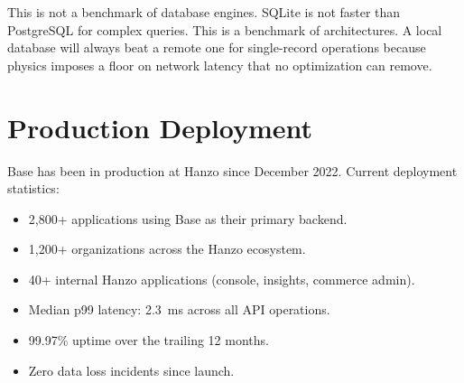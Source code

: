 \documentclass[11pt]{article}
\begin{document}
\begin{center}
\end{center}

This is not a benchmark of database engines. SQLite is not faster than
PostgreSQL for complex queries. This is a benchmark of architectures. A local
database will always beat a remote one for single-record operations because
physics imposes a floor on network latency that no optimization can remove.

\section{Production Deployment}
\label{sec:production}

Base has been in production at Hanzo since December 2022. Current deployment
statistics:

\begin{itemize}[leftmargin=1.1em]
    \item 2,800+ applications using Base as their primary backend.
    \item 1,200+ organizations across the Hanzo ecosystem.
    \item 40+ internal Hanzo applications (console, insights, commerce admin).
    \item Median p99 latency: 2.3~ms across all API operations.
    \item 99.97\% uptime over the trailing 12 months.
    \item Zero data loss incidents since launch.
\end{itemize}
\end{document}
